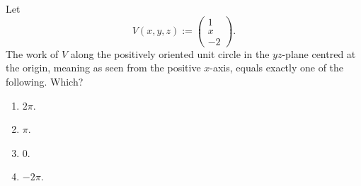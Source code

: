 \begin{exercise}
\label{ex:kobel_line_integral_yz_circle}
Let
\[V(x,y,z) := \begin{pmatrix} 1 \\ x \\ -2 \end{pmatrix}.\]
The work of $V$ along the positively oriented unit circle in the $yz$-plane centred at the origin,
 meaning as seen from the positive $x$-axis, equals exactly one of the
following. Which?
\begin{enumerate}[label=\textbf{(\alph*)}]
  \item $2\pi$.
  \item $\pi$.
  \item $0$.
  \item $-2\pi$.
\end{enumerate}
\end{exercise}

